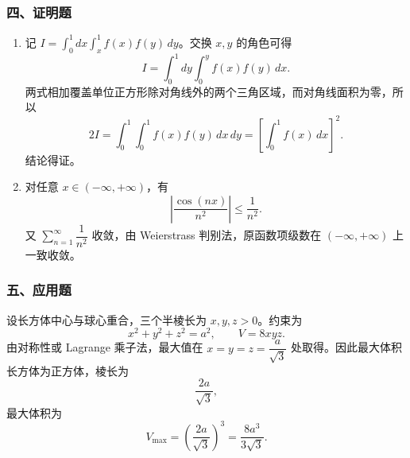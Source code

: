 \subsubsection*{四、证明题}
\begin{enumerate}
  \item 记 $I=\int_0^1 dx\int_x^1 f(x)f(y)\,dy$。交换 $x,y$ 的角色可得
  \[
  I=\int_0^1 dy\int_0^y f(x)f(y)\,dx.
  \]
  两式相加覆盖单位正方形除对角线外的两个三角区域，而对角线面积为零，所以
  \[
  2I=\int_0^1\int_0^1 f(x)f(y)\,dx\,dy
  =\left[\int_0^1 f(x)\,dx\right]^2.
  \]
  结论得证。
  \item 对任意 $x\in(-\infty,+\infty)$，有
  \[
  \left|\frac{\cos(nx)}{n^2}\right|\le \frac1{n^2}.
  \]
  又 $\sum_{n=1}^{\infty}\dfrac1{n^2}$ 收敛，由 Weierstrass 判别法，原函数项级数在 $(-\infty,+\infty)$ 上一致收敛。
\end{enumerate}

\subsubsection*{五、应用题}
设长方体中心与球心重合，三个半棱长为 $x,y,z>0$。约束为
\[
x^2+y^2+z^2=a^2,\qquad V=8xyz.
\]
由对称性或 Lagrange 乘子法，最大值在 $x=y=z=\dfrac a{\sqrt3}$ 处取得。因此最大体积长方体为正方体，棱长为
\[
\frac{2a}{\sqrt3},
\]
最大体积为
\[
V_{\max}=\left(\frac{2a}{\sqrt3}\right)^3=\frac{8a^3}{3\sqrt3}.
\]
